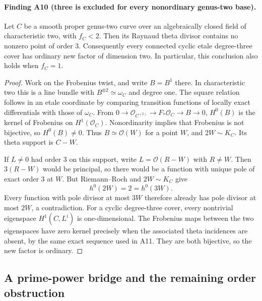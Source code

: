 \paragraph{Finding A10 (three is excluded for every nonordinary genus-two base).}
Let $C$ be a smooth proper genus-two curve over an algebraically
closed field of characteristic two, with $f_C<2$. Then its Raynaud
theta divisor contains no nonzero point of order $3$.
Consequently every connected cyclic etale degree-three cover has
ordinary new factor of dimension two. In particular, this conclusion
also holds when $f_C=1$.

\begin{proof}
Work on the Frobenius twist, and write $B=B^1$ there. In
characteristic two this is a line bundle with $B^{\otimes2}\simeq
\omega_C$ and degree one. The square relation follows in an etale
coordinate by comparing transition functions of locally exact
differentials with those of $\omega_C$.
From $0\to\mathcal O_{C^{(2)}}\to F_*\mathcal O_C\to B\to0$,
$H^0(B)$ is the kernel of Frobenius on $H^1(\mathcal O_C)$.
Nonordinarity implies that Frobenius is not bijective, so $H^0(B)\ne0$.
Thus $B\simeq\mathcal O(W)$ for a point $W$, and
$2W\sim K_C$. Its theta support is $C-W$.

If $L\ne0$ had order $3$ on this support, write
$L=\mathcal O(R-W)$ with $R\ne W$. Then $3(R-W)$ would be
principal, so there would be a function with unique pole of exact
order $3$ at $W$. But Riemann--Roch and $2W\sim K_C$ give
\[
 h^0(2W)=2=h^0(3W).
\]
Every function with pole divisor at most $3W$ therefore already has
pole divisor at most $2W$, a contradiction.
For a cyclic degree-three cover, every nontrivial eigenspace
$H^1(C,L^i)$ is one-dimensional. The Frobenius maps between the
two eigenspaces have zero kernel precisely when the associated
theta incidences are absent, by the same exact sequence used in
A11. They are both bijective, so the new factor is ordinary.
\end{proof}

\subsection{A prime-power bridge and the remaining order obstruction}
\label{sec:prime-power-bridge}


